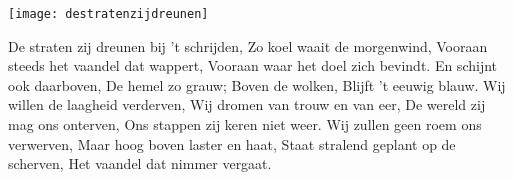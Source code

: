 \begin{intersong}
    \texttt{[image: destratenzijdreunen]}
\end{intersong}
\beginverse*
De straten zij dreunen bij 't schrijden,
Zo koel waait de morgenwind,
Vooraan steeds het vaandel dat wappert,
Vooraan waar het doel zich bevindt.
\endverse
\beginchorus
En schijnt ook daarboven, De hemel zo grauw;
Boven de wolken, Blijft 't eeuwig blauw.
\endchorus
\beginverse*
Wij willen de laagheid verderven,
Wij dromen van trouw en van eer,
De wereld zij mag ons onterven,
Ons stappen zij keren niet weer.
\endverse
\beginverse*
Wij zullen geen roem ons verwerven,
Maar hoog boven laster en haat,
Staat stralend geplant op de scherven,
Het vaandel dat nimmer vergaat.
\endverse
\endsong